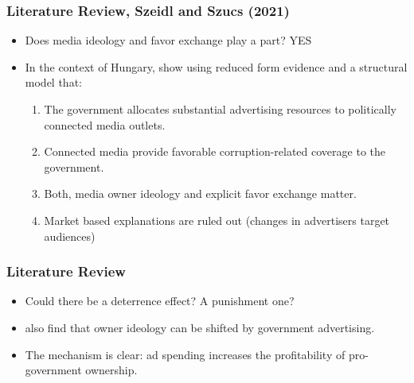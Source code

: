 \documentclass[10pt,aspectratio=169]{beamer}
\begin{document}
\begin{frame}
\frametitle{Literature Review, Szeidl and Szucs (2021)}

\small
\begin{itemize}
\item Does media ideology and favor exchange play a part? YES
\item In the context of Hungary,  \cite{MediaCapture} show using reduced form evidence and a structural model that: 

\begin{enumerate}
    \item The government allocates substantial advertising resources to politically connected media outlets.
    \item Connected media provide favorable corruption-related coverage to the government.
    \item Both, media owner ideology and explicit favor exchange matter. 
    \item Market based explanations are ruled out (changes in advertisers target audiences)
\end{enumerate}

\end{itemize}
\end{frame}

\begin{frame}
\frametitle{Literature Review}

\small
\begin{itemize}
\item Could there be a deterrence effect? A punishment one?
\item \cite{MediaCapture} also find that owner ideology can be shifted by government advertising.
\item The mechanism is clear: ad spending increases the profitability of pro-government ownership.

\end{itemize}
\end{frame}
\end{document}
